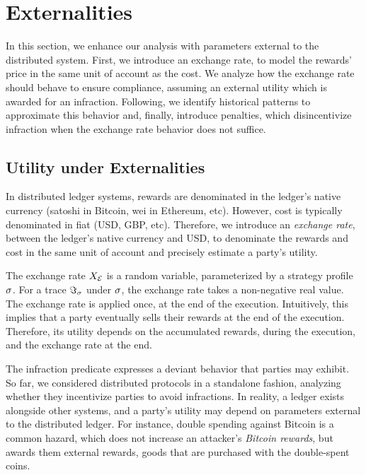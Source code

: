 \section{Externalities}\label{sec:externalities}

In this section, we enhance our analysis with parameters external to
the distributed system. First, we introduce an exchange rate,
to model the rewards' price in the same unit of account as the cost. We
analyze how the exchange rate should behave to ensure compliance, assuming
an external utility which is awarded for an infraction. Following,
we identify historical patterns to approximate this behavior and, finally,
introduce penalties, which disincentivize infraction when the exchange rate
behavior does not suffice.

\subsection{Utility under Externalities}

In distributed ledger systems, rewards are denominated in the ledger's native
currency (\ie satoshi in Bitcoin, wei in Ethereum, etc). However, cost is
typically denominated in fiat (USD, GBP, etc). Therefore, we introduce
an \emph{exchange rate}, between the ledger's native currency and USD, to
denominate the rewards and cost in the same unit of account and precisely
estimate a party's utility.

The exchange rate $X_{\mathcal{E}}$ is a random variable,
parameterized by a strategy profile $\sigma$. For a trace
$\Im_{\sigma}$ under $\sigma$, the exchange rate takes a
non-negative real value. The exchange rate is applied once, at the end of the
execution. Intuitively, this implies that a party eventually sells their
rewards at the end of the execution. Therefore, its utility depends on the
accumulated rewards, during the execution, and the exchange rate at the end.

The infraction predicate expresses a deviant behavior that parties may exhibit.
So far, we considered distributed protocols in a standalone fashion, analyzing
whether they incentivize parties to avoid infractions. In reality, a ledger
exists alongside other systems, and a party's utility may depend on parameters
external to the distributed ledger. For instance, double spending against
Bitcoin is a common hazard, which does not increase an attacker's \emph{Bitcoin
rewards}, but awards them external rewards, \eg goods that are purchased with
the double-spent coins.

